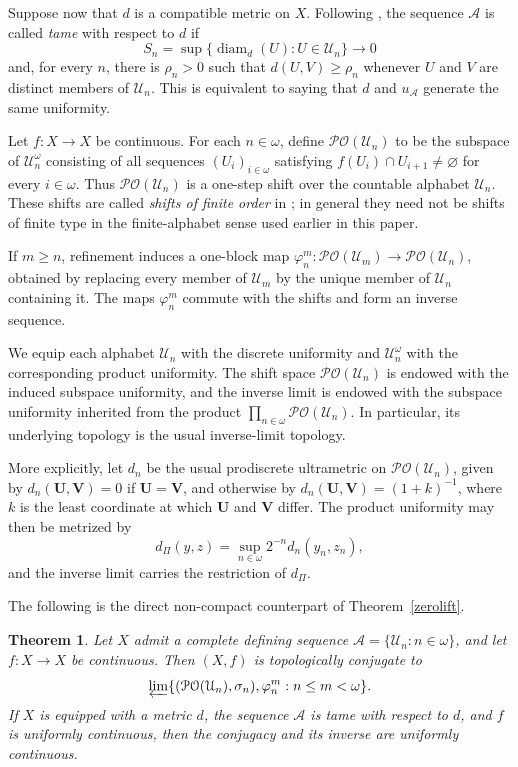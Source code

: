 \documentclass[10pt,a4paper]{amsart}
\newtheorem{theorem}{Theorem}[section]
\numberwithin{equation}{section}
\begin{document}
Suppose now that $d$ is a compatible metric on $X$. Following
\cite{Darji}, the sequence $\mathcal A$ is called \emph{tame} with respect
to $d$ if
\[
S_n=\sup\{\operatorname{diam}_d(U):U\in\mathcal U_n\}\longrightarrow 0
\]
and, for every $n$, there is $\rho_n>0$ such that
$d(U,V)\geq\rho_n$ whenever $U$ and $V$ are distinct members of
$\mathcal U_n$. This is equivalent to saying that $d$ and
$u_{\mathcal A}$ generate the same uniformity.

Let $f:X\to X$ be continuous. For each $n\in\omega$, define
$\mathcal{PO}(\mathcal U_n)$ to be the subspace of
$\mathcal U_n^\omega$ consisting of all sequences
$(U_i)_{i\in\omega}$ satisfying
$f(U_i)\cap U_{i+1}\neq\varnothing$ for every $i\in\omega$.
Thus $\mathcal{PO}(\mathcal U_n)$ is a one-step shift over the countable
alphabet $\mathcal U_n$. These shifts are called \emph{shifts of finite order} in
\cite{Darji}; in general they need not be shifts of finite type in the
finite-alphabet sense used earlier in this paper.

If $m\geq n$, refinement induces a one-block map
$\varphi_n^m:\mathcal{PO}(\mathcal U_m)\to
\mathcal{PO}(\mathcal U_n)$, obtained by replacing every member of
$\mathcal U_m$ by the unique member of $\mathcal U_n$ containing it. The
maps $\varphi_n^m$ commute with the shifts and form an inverse sequence.

We equip each alphabet $\mathcal U_n$ with the discrete uniformity and
$\mathcal U_n^\omega$ with the corresponding product uniformity. The shift
space $\mathcal{PO}(\mathcal U_n)$ is endowed with the induced subspace
uniformity, and the inverse limit is endowed with the subspace uniformity
inherited from the product $\prod_{n\in\omega}\mathcal{PO}(\mathcal U_n)$.
In particular, its underlying topology is the usual inverse-limit topology.

More explicitly, let $d_n$ be the usual prodiscrete ultrametric on
$\mathcal{PO}(\mathcal U_n)$, given by $d_n(\mathbf U, \mathbf V)=0$ if
$\mathbf U= \mathbf V$, and otherwise by
$d_n(\mathbf U, \mathbf V)=(1+k)^{-1}$, where $k$ is the least coordinate at
which $\mathbf U$ and $\mathbf V$ differ. The product uniformity may then be
metrized by
\[
d_{\Pi}(y,z)=\sup_{n\in\omega}2^{-n}d_n(y_n,z_n),
\]
and the inverse limit carries the restriction of $d_{\Pi}$.

The following is the direct non-compact counterpart of
Theorem~\ref{zerolift}.


\begin{theorem}\label{thm:nonarch-representation}
Let $X$ admit a complete defining sequence
$\mathcal A=\{\mathcal U_n:n\in\omega\}$, and let $f:X\to X$ be continuous.
Then $(X,f)$ is topologically conjugate to
\[
\varprojlim
\{(\mathcal{PO}(\mathcal U_n),\sigma_n),\varphi_n^m:
n\leq m<\omega\}.
\]
If $X$ is equipped with a metric $d$, the sequence $\mathcal A$ is tame
with respect to $d$, and $f$ is uniformly continuous, then the conjugacy
and its inverse are uniformly continuous.
\end{theorem}
\end{document}
